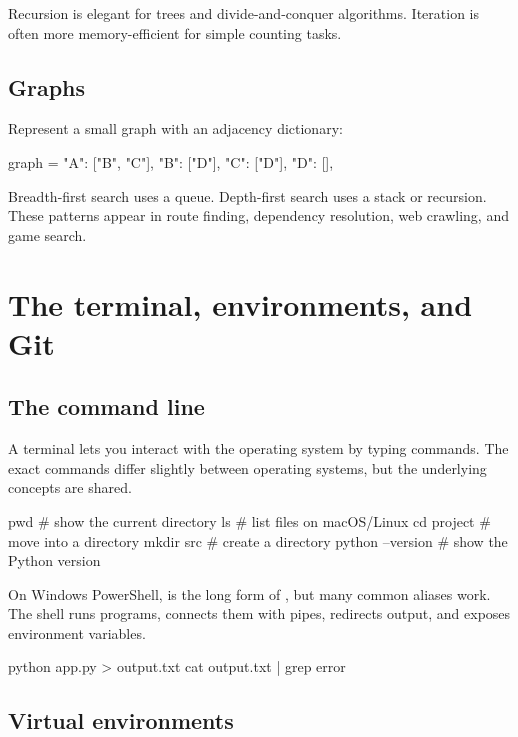 \documentclass[11pt,openany,oneside]{book}
\newcommand{\inlinecode}[1]{\texttt{\small\detokenize{#1}}}
\begin{document}
Recursion is elegant for trees and divide-and-conquer algorithms. Iteration is often more memory-efficient for simple counting tasks.

\section{Graphs}

Represent a small graph with an adjacency dictionary:

\begin{code}[language=Python]
graph = {
    "A": ["B", "C"],
    "B": ["D"],
    "C": ["D"],
    "D": [],
}
\end{code}

Breadth-first search uses a queue. Depth-first search uses a stack or recursion. These patterns appear in route finding, dependency resolution, web crawling, and game search.

\chapter{The terminal, environments, and Git}

\section{The command line}

A terminal lets you interact with the operating system by typing commands. The exact commands differ slightly between operating systems, but the underlying concepts are shared.

\begin{code}[language=bash]
pwd                 # show the current directory
ls                  # list files on macOS/Linux
cd project          # move into a directory
mkdir src           # create a directory
python --version    # show the Python version
\end{code}

On Windows PowerShell, \inlinecode{Get-ChildItem} is the long form of \inlinecode{ls}, but many common aliases work. The shell runs programs, connects them with pipes, redirects output, and exposes environment variables.

\begin{code}[language=bash]
python app.py > output.txt
cat output.txt | grep error
\end{code}

\section{Virtual environments}
\end{document}

